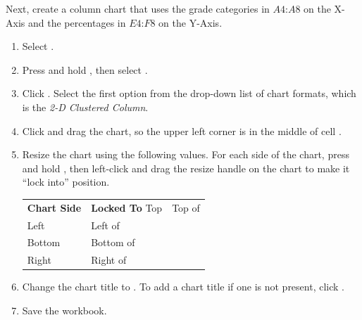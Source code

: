 Next, create a column chart that uses the grade categories in $ A4 $:$ A8 $ on the X-Axis and the percentages in $ E4 $:$ F8 $ on the Y-Axis. 

\begin{enumbox}
	\begin{enumerate}
		\item Select .
		\item Press and hold , then select .
		\item Click . Select the first option from the drop-down list of chart formats, which is the \textit{2-D Clustered Column}.
		\item Click and drag the chart, so the upper left corner is in the middle of cell .
		\item Resize the chart using the following values. For each side of the chart, press and hold , then left-click and drag the resize handle on the chart to make it ``lock into'' position.
	
		\begin{table}[H]
		\captionsetup{labelformat=empty} %
		{\small
			\begin{longtable}{R{0.75in}L{1.50in}} %
				\textbf{Chart Side} & \textbf{Locked To} \endhead
				\hline
				Top & Top of \\
				Left & Left of \\
				Bottom & Bottom of \\
				Right & Right of \\
			\end{longtable}
		} %
		\end{table}
	
		\item Change the chart title to . To add a chart title if one is not present, click .
		\item Save the  workbook.
	\end{enumerate}
\end{enumbox}

